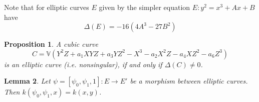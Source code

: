\documentclass{scrartcl}
\newcommand{\V}{\mathbb{V}}
\newtheorem{prop}{Proposition}[section]
\newtheorem{lemma}[prop]{Lemma}
\theoremstyle{definition}
\begin{document}
Note that for elliptic curves $E$ given by the simpler equation $E: y^2 = x^3 + Ax + B$ have
\begin{equation*}
    \Delta(E) = -16(4A^3 - 27B^2)
\end{equation*}

\begin{prop}
    A cubic curve
    \begin{equation*}
        C = \V( Y^2 Z + a_1 XYZ + a_3 YZ^2 - X^3 - a_2 X^2 Z - a_4 XZ^2 - a_6 Z^3 )
    \end{equation*}
    is an elliptic curve (i.e. nonsingular), if and only if $\Delta(C) \neq 0$.
\end{prop}

\begin{lemma}
    \label{prop:morphism_depends_on_y}
    Let $\psi = [\psi_0, \psi_1, 1]: E \to E'$ be a morphism between elliptic curves.
    Then $k(\psi_0, \psi_1, x) = k(x, y)$.
\end{lemma}
\end{document}
